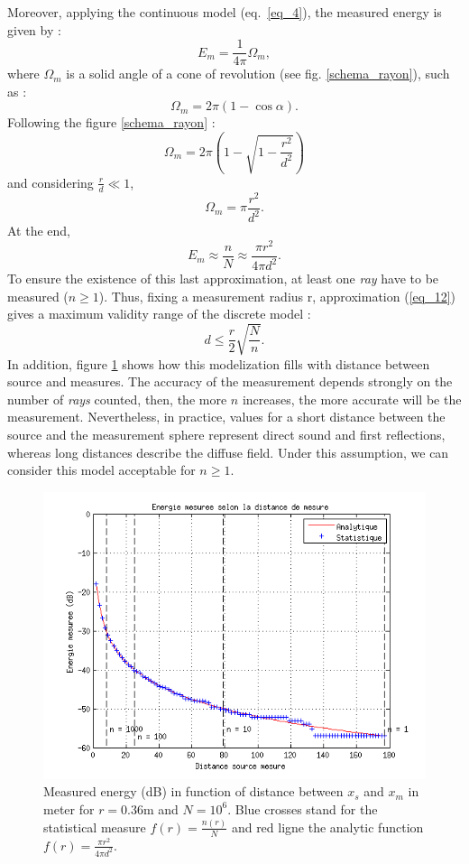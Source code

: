 \documentclass[AMA,STIX1COL]{WileyNJD-v2}
\begin{document}
Moreover, applying the continuous model (eq.~\ref{eq_4}), the measured energy is given by :
\begin{equation}
E_m = \frac{1}{4\pi}  \Omega_m,
\end{equation}
where $\Omega_m$ is a solid angle of a cone of revolution (see fig. \ref{schema_rayon}), such as :
\begin{equation}
\Omega_m = 2\pi(1-\cos{\alpha}).
\end{equation}
Following the figure \ref{schema_rayon} :
\begin{equation}
\Omega_m = 2\pi \left( 1 - \sqrt{1-\frac{r^2}{d^2}} \right)
\end{equation}
and considering $\frac{r}{d} \ll 1$, 
\begin{equation}
\Omega_m = \pi \frac{r^2}{d^2}.
\end{equation}
At the end, 
\begin{equation}
E_m \approx  \frac{n}{N} \approx  \frac{\pi r^2}{4\pi d^2}.
\label{eq_12}
\end{equation}
To ensure the existence of this last approximation, at least one \textit{ray} have to be measured ($n\geq1$). Thus, fixing a measurement radius r, approximation (\ref{eq_12}) gives a maximum validity range of the discrete model :  
\begin{equation}
	d \leq \frac{r}{2}\sqrt{\frac{N}{n}}.
\end{equation}
In addition, figure \ref{energie} shows how this modelization fills with distance between source and measures. The accuracy of the measurement depends strongly on the number of  \textit{rays} counted, then, the more $n$ increases, the more accurate will be the measurement. Nevertheless, in practice, values for a short distance between the source and the measurement sphere represent direct sound and first reflections, whereas long distances describe the diffuse field. Under this assumption, we can consider this model acceptable for $n\geq1$. 

\begin{figure}[t]
\centering
	\includegraphics[width=0.8\linewidth]{energie.png}
	\caption{Measured energy (dB) in function of distance between $x_s$ and $x_m$ in meter for $r = 0.36$m and $N = 10^6$. Blue crosses stand for the statistical measure $f(r) = \frac{n(r)}{N}$ and red ligne the analytic function $f(r) = \frac{\pi r^2}{4\pi d^2}$.}
	\label{energie}
\end{figure}
\end{document}
